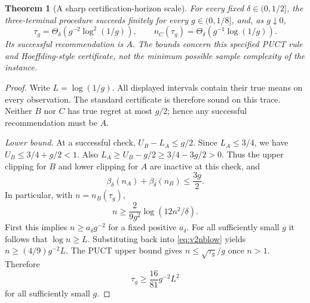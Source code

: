 \documentclass{article}
\theoremstyle{plain}
\newtheorem{theorem}{Theorem}[section]
\theoremstyle{definition}
\begin{document}
\begin{theorem}[A sharp certification-horizon scale]
\label{thm:v2horizon}
For every fixed $\delta\in(0,1/2]$, the three-terminal procedure succeeds
finitely for every $g\in(0,1/8]$, and, as $g\downarrow0$,
\begin{equation}
 \boxed{\quad
 \tau_g=\Theta_\delta\!\left(g^{-2}\log^2(1/g)\right),\qquad
 n_C(\tau_g)=\Theta_\delta\!\left(g^{-1}\log(1/g)\right).
 \quad}
 \label{eq:v2horizonscale}
\end{equation}
Its successful recommendation is $A$. The bounds concern this specified
PUCT rule and Hoeffding-style certificate, not the minimum possible
sample complexity of the instance.
\end{theorem}
\begin{proof}
Write $L=\log(1/g)$. All displayed intervals contain their true means
on every observation. The standard certificate is therefore sound on
this trace. Neither $B$ nor $C$ has true regret at most $g/2$; hence any
successful recommendation must be $A$.

\emph{Lower bound.} At a successful check,
$U_B-L_A\le g/2$. Since $L_A\le3/4$, we have
$U_B\le3/4+g/2<1$. Also
$L_A\ge U_B-g/2\ge3/4-3g/2>0$.
Thus the upper clipping for $B$ and lower clipping for $A$ are inactive
at this check, and
\begin{equation}
 \beta_\delta(n_A)+\beta_\delta(n_B)\le\frac{3g}{2}.
 \label{eq:v2necessary}
\end{equation}
In particular, with $n=n_B(\tau_g)$,
\begin{equation}
 n\ge\frac{2}{9g^2}\log(12n^2/\delta).
 \label{eq:v2nblow}
\end{equation}
First this implies $n\ge a_\delta g^{-2}$ for a fixed positive
$a_\delta$. For all sufficiently small $g$ it follows that
$\log n\ge L$. Substituting back into \eqref{eq:v2nblow} yields
$n\ge (4/9)g^{-2}L$. The PUCT upper bound gives
$n\le\sqrt{\tau_g}/g$ once $n>1$. Therefore
\[
 \tau_g\ge\frac{16}{81}g^{-2}L^2
\]
for all sufficiently small $g$.


\end{proof}
\end{document}
